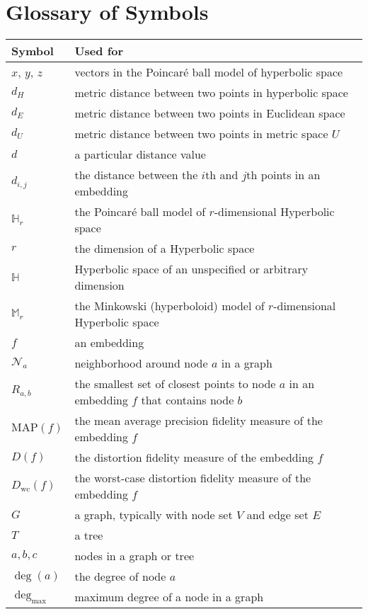 
\section{Glossary of Symbols}

\begin{table*}[h]
\centering
\begin{tabular}{l l}
\toprule
Symbol & Used for \\
\midrule
$x$, $y$, $z$ & vectors in the Poincar{\'e} ball model of hyperbolic space \\
$d_H$ & metric distance between two points in hyperbolic space \\
$d_E$ & metric distance between two points in Euclidean space \\
$d_U$ & metric distance between two points in metric space $U$ \\
$d$ & a particular distance value \\
$d_{i,j}$ & the distance between the $i$th and $j$th points in an embedding \\
$\mathbb{H}_r$ & the Poincar{\'e} ball model of $r$-dimensional Hyperbolic space \\
$r$ & the dimension of a Hyperbolic space \\
$\mathbb{H}$ & Hyperbolic space of an unspecified or arbitrary dimension \\
$\mathbb{M}_r$ & the Minkowski (hyperboloid) model of $r$-dimensional Hyperbolic space \\
$f$ & an embedding \\
$\mathcal{N}_a$ & neighborhood around node $a$ in a graph \\
$R_{a,b}$ & the smallest set of closest points to node $a$ in an embedding $f$ that contains node $b$ \\
$\text{MAP}(f)$ & the mean average precision fidelity measure of the embedding $f$ \\
$D(f)$ & the distortion fidelity measure of the embedding $f$ \\
$D_{\mathrm{wc}}(f)$ & the worst-case distortion fidelity measure of the embedding $f$ \\
$G$ & a graph, typically with node set $V$ and edge set $E$ \\
$T$ & a tree \\
$a, b, c$ & nodes in a graph or tree \\
$\operatorname{deg}(a)$ & the degree of node $a$ \\
$\operatorname{deg}_{\max}$ & maximum degree of a node in a graph \\

\end{tabular}
\end{table*}
